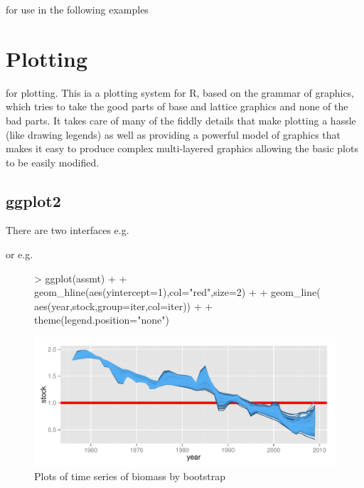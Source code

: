 \documentclass[shortnames,nojss,article]{jss}
\begin{document}
for use in the following examples


\section{Plotting}

 \href{http://ggplot2.org}{} for plotting. This ia a plotting system for R, 
based on the grammar of graphics, which tries to take the good parts of base and lattice graphics and none of the bad parts. 
It takes care of many of  the fiddly details that make plotting a hassle (like drawing legends) as well as providing a powerful model 
of graphics that makes it easy to produce complex multi-layered graphics allowing the basic plots to be easily modified. 


\subsection{ggplot2}

There are two interfaces  e.g.


or   e.g.

\begin{figure}\begin{center}
\begin{Schunk}
\begin{Sinput}
> ggplot(assmt)                                       + 
+   geom_hline(aes(yintercept=1),col="red",size=2)    + 
+   geom_line( aes(year,stock,group=iter,col=iter))   +
+   theme(legend.position="none")
\end{Sinput}
\end{Schunk}
\includegraphics{kobe-013}
\caption{Plots of time series of biomass by bootstrap}
\end{center}\end{figure}
\end{document}
